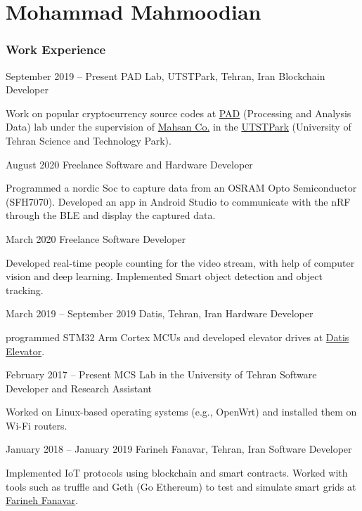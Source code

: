 \documentclass{tccv}
\begin{document}
	
	\part{Mohammad Mahmoodian}
	
	\section{Work Experience}
	
	\begin{eventlist}
		\item{September 2019 -- Present}
		{PAD Lab, UTSTPark, Tehran, Iran}
		{Blockchain Developer}
		
		Work on popular cryptocurrency source codes at \href{www.padlab.ir}{PAD} (Processing and Analysis Data) lab under the supervision of \href{www.mahsan.co}{Mahsan Co.} in the \href{www.utstpark.ir}{UTSTPark} (University of Tehran Science and Technology Park).
		
		\item{August 2020}
		{Freelance}
		{Software and Hardware Developer}
		
		Programmed a nordic Soc to capture data from an OSRAM Opto Semiconductor (SFH7070). Developed an app in Android Studio to communicate with the nRF through the BLE and display the captured data.
		
		\item{March 2020}
		{Freelance}
		{Software Developer}
		
		Developed real-time people counting for the video stream, with help of computer vision and deep learning. Implemented Smart object detection and object tracking.
		
		\item{March 2019 -- September 2019}
		{Datis, Tehran, Iran}
		{Hardware Developer}
		
		programmed STM32 Arm Cortex MCUs and developed elevator drives at \href{www.datis-elevator.ir}{Datis Elevator}.
		
		\item{February 2017 -- Present}
		{MCS Lab in the University of Tehran}
		{Software Developer and Research Assistant}
		
		Worked on Linux-based operating systems (e.g., OpenWrt) and installed them on Wi-Fi routers.
		
		\item{January 2018 -- January 2019}
		{Farineh Fanavar, Tehran, Iran}
		{Software Developer}
		
		Implemented IoT protocols using blockchain and smart contracts. Worked with tools such as truffle and Geth (Go Ethereum) to test and simulate smart grids at \href{http://farinehtech.com/}{Farineh Fanavar}.
		
		
	\end{eventlist}
	
\end{document}

